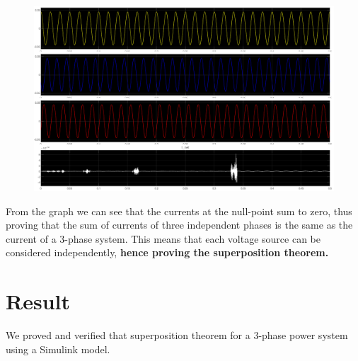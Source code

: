 \documentclass[a4paper,12pt]{article}
\begin{document}
  \begin{figure}[H]
    \centering
    \includegraphics[width=4.5in]{img/I_scope.png}
  \end{figure}
  \pagebreak
  From the graph we can see that the currents at the null-point sum to zero, thus
  proving that the sum of currents of three independent phases is the same as the 
  current of a 3-phase system. This means that each voltage source can be considered
  independently, {\bf hence proving the superposition theorem.}

  \section{Result}
  We proved and verified that superposition theorem for a 3-phase power system using
  a Simulink model.
\end{document}
